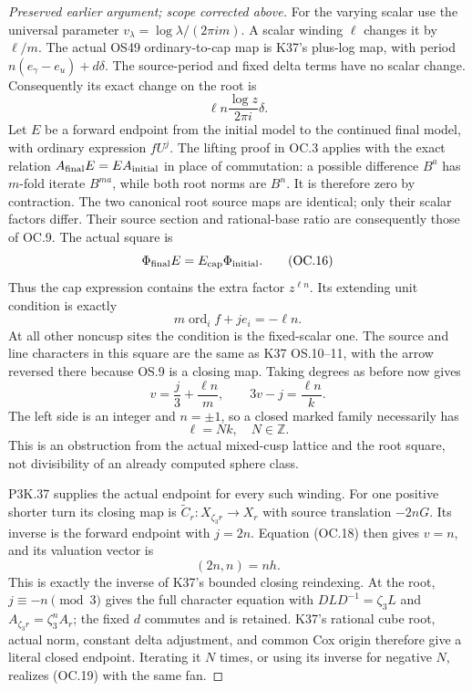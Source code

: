 \begin{proof}[Preserved earlier argument; scope corrected above]
For the varying scalar use the universal parameter
\(v_\lambda=\log\lambda/(2\pi i m)\). A scalar winding
\(\ell\) changes it by \(\ell/m\). The actual OS49
ordinary-to-cap map is K37's plus-log map, with period
\(n(e_\gamma-e_u)+d\delta\). The source-period and fixed
delta terms have no scalar change. Consequently its exact change
on the root is
\[
                  \ell n\frac{\log z}{2\pi i}\delta.    \tag{OC.15}
\]
Let \(E\) be a forward endpoint from the initial model to the
continued final model, with ordinary expression \(fU^j\).
The lifting proof in OC.3 applies with the exact relation
\(A_{\rm final}E=EA_{\rm initial}\) in place of commutation:
a possible difference \(B^a\) has \(m\)-fold iterate
\(B^{ma}\), while both root norms are \(B^n\). It is
therefore zero by contraction. The two canonical root source maps
are identical; only their scalar factors differ. Their source
section and rational-base ratio are consequently those of OC.9.
The actual square is
\[
          \Phi_{\rm final}E=E_{\rm cap}\Phi_{\rm initial}.
                                                               \tag{OC.16}
\]
Thus the cap expression contains the extra factor \(z^{\ell n}\).
Its extending unit condition is exactly
\[
        m\operatorname{ord}_{i}f+je_i=-\ell n.            \tag{OC.17}
\]
At all other noncusp sites the condition is the fixed-scalar one.
The source and line characters in this square are the same as K37
OS.10--11, with the arrow reversed there because OS.9 is a closing
map. Taking degrees as before now gives
\[
             v=\frac j3+\frac{\ell n}{m},\qquad
                      3v-j=\frac{\ell n}{k}.             \tag{OC.18}
\]
The left side is an integer and \(n=\pm1\), so a closed
marked family necessarily has
\[
                              \ell=Nk,\quad N\in\mathbb Z.
                                                               \tag{OC.19}
\]
This is an obstruction from the actual mixed-cusp lattice and the
root square, not divisibility of an already computed sphere class.

P3K.37 supplies the actual endpoint for every such winding. For one
positive shorter turn its closing map is
\(\widetilde C_r:X_{\zeta_3r}\to X_r\) with source
translation \(-2nG\). Its inverse is the forward endpoint with
\(j=2n\). Equation (OC.18) then gives \(v=n\), and its
valuation vector is
\[
                           (2n,n)=n h.                  \tag{OC.20}
\]
This is exactly the inverse of K37's bounded closing reindexing.
At the root, \(j\equiv-n\pmod3\) gives the full character
equation with \(DLD^{-1}=\zeta_3L\) and
\(A_{\zeta_3r}=\zeta_3^n A_r\); the fixed \(d\)
commutes and is retained. K37's rational cube root, actual norm,
constant delta adjustment, and common Cox origin therefore give a
literal closed endpoint. Iterating it \(N\) times, or using its
inverse for negative \(N\), realizes (OC.19) with the same fan.


\end{proof}
